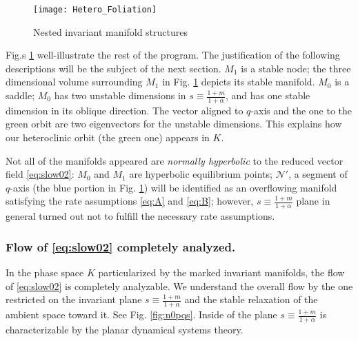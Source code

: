 \documentclass[a4paper,11pt]{article}
\theoremstyle{remark}
\begin{document}
\begin{figure}[ht] 
 \centering
 \texttt{[image: Hetero\_Foliation]} 
  \caption{Nested invariant manifold structures} \label{fig:HF} 
\end{figure}
Fig.s \ref{fig:HF} well-illustrate the rest of the program. The justification of the following descriptions will be the subject of the next section. $M_1$ is a stable node; the three dimensional volume surrounding $M_1$ in Fig. \ref{fig:HF} depicts its stable manifold. $M_0$ is a saddle; $M_0$ has two unstable dimensions in $s\equiv\tfrac{1+m}{1+\alpha}$, and has one stable dimension in its oblique direction. The vector aligned to $q$-axis and the one to the green orbit are two eigenvectors for the unstable dimensions. This explains how our heteroclinic orbit (the green one) appears in $K$. %

Not all of the manifolds appeared are {\it normally hyperbolic} to the reduced vector field \eqref{eq:slow02}: $M_0$ and $M_1$ are hyperbolic equilibrium points; $\mathcal{N}'$, a segment of $q$-axis (the blue portion in Fig. \ref{fig:HF}) will be identified as an overflowing manifold satisfying the rate assumptions \eqref{eq:A} and \eqref{eq:B}; however, $s\equiv \tfrac{1+m}{1+\alpha}$ plane in general turned out not to fulfill the necessary rate assumptions. 



\subsubsection{Flow of \eqref{eq:slow02} completely analyzed.}%

In the phase space $K$ particularized by the marked invariant manifolds, the flow of \eqref{eq:slow02} is completely analyzable. We understand the overall flow by the one restricted on the invariant plane $s\equiv\tfrac{1+m}{1+\alpha}$ and the stable relaxation of the ambient space toward it. See Fig. \ref{fig:n0pqs}. Inside of the plane $s\equiv\tfrac{1+m}{1+\alpha}$ is characterizable by the planar dynamical systems theory.
\end{document}

